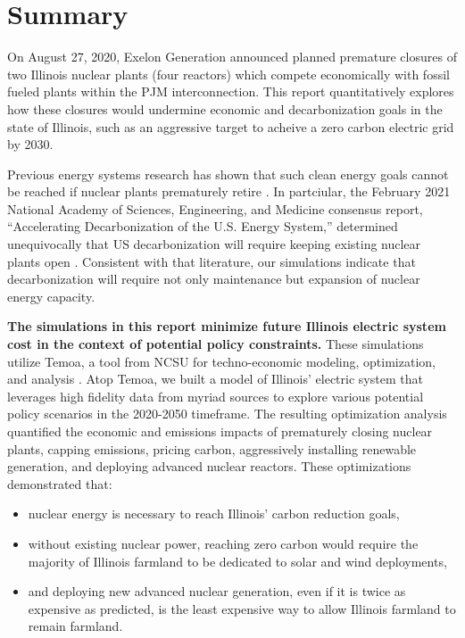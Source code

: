 \section{Summary}
On August 27, 2020, Exelon Generation announced planned premature closures of 
two Illinois nuclear plants (four reactors) which compete economically with 
fossil fueled plants \cite{larson_exelon_2020} within the 
\gls{PJM} interconnection.  This report quantitatively explores how these 
closures would undermine economic and decarbonization goals in the state of 
Illinois, such as an aggressive target to acheive a zero carbon electric grid 
by 2030.  

Previous energy systems research has shown that such clean energy goals cannot 
be reached if nuclear plants prematurely retire 
\cite{national_academies_of_sciences_engineering_and_medicine_2021_accelerating_2021,larson_net-zero_2020,davis_net-zero_2018}.  
In partciular, the February 2021 National Academy of Sciences, Engineering, and 
Medicine consensus report, ``Accelerating Decarbonization of the U.S. Energy 
System,'' determined unequivocally that US decarbonization will require keeping 
existing nuclear plants open 
\cite{national_academies_of_sciences_engineering_and_medicine_2021_accelerating_2021}. 
Consistent with that literature, our simulations indicate that decarbonization will 
require not only maintenance but expansion of nuclear energy capacity. 

\textbf{The simulations in this report minimize future Illinois electric system 
cost in the context of potential policy constraints.} These simulations 
utilize Temoa, a tool from \gls{NCSU} for techno-economic modeling, 
optimization, and analysis \cite{decarolis_temoa_2010,decarolis_modelling_2016,decarolis_formalizing_2017}. 
Atop Temoa, we built a model of Illinois' electric system that leverages high 
fidelity data from myriad sources to explore various potential policy scenarios 
in the 2020-2050 timeframe. The resulting optimization analysis quantified the 
economic and emissions impacts of prematurely closing nuclear plants, capping 
emissions, pricing carbon, aggressively installing renewable generation, and 
deploying advanced nuclear reactors.  These optimizations demonstrated that:


\begin{itemize}
        \item nuclear energy is necessary to reach Illinois' carbon reduction 
                goals,
        \item without existing nuclear power, reaching zero carbon would 
                require the majority of Illinois farmland to be dedicated to 
                solar and wind deployments,
        \item and deploying new advanced nuclear generation, even if it is 
                twice as expensive as predicted, is the least expensive way to 
                allow Illinois farmland to remain farmland.
  \end{itemize}

